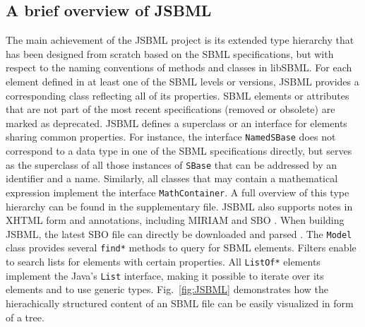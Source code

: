 \documentclass{bioinfo}
\begin{document}
\begin{methods}
\section{A brief overview of JSBML}

The main achievement of the JSBML project is its extended type hierarchy that
has been designed from scratch based on the SBML specifications, but with
respect to the naming conventions of methods and classes in libSBML. For each
element defined in at least one of the SBML levels or versions, JSBML provides a
corresponding class reflecting all of its properties. SBML elements or
attributes that are not part of the most recent specifications (removed or
obsolete) are marked as deprecated. JSBML defines a superclass or an
interface for elements sharing common properties. For instance, the interface
\texttt{NamedSBase} does not correspond to a data type in one of the SBML
specifications directly, but serves as the superclass of all those instances of
\texttt{SBase} that can be addressed by an identifier and a name. Similarly, all
classes that may contain a mathematical expression implement the
interface \texttt{MathContainer}. A full overview of this type hierarchy can be
found in the supplementary file. JSBML also supports notes in XHTML form and
annotations, including MIRIAM \citep{Novere2005} and SBO \citep{Novere2006b}.
When building JSBML, the latest SBO file can directly be downloaded and parsed
\citep{Holland2008}.
The \texttt{Model} class provides several \texttt{find*}
methods to query for SBML elements. Filters enable to search lists for elements
with certain properties. All \texttt{ListOf*} elements implement the Java's
\texttt{List} interface, making it possible to iterate over its elements and to
use generic types. Fig.~\ref{fig:JSBML} demonstrates how the hierachically
structured content of an SBML file can be easily visualized in form of a tree.
\begin{figure}
\centerline{
  }
\end{figure}
\end{methods}
\end{document}
